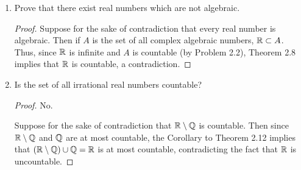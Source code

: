 \documentclass[../psets.tex]{subfiles}
\begin{document}
\begin{enumerate}[label={\textbf{\arabic*.}}]
\begin{proof}
        Define a family of sets $\{A_N\}$ such that each $A_N$ is the set of all complex zeroes of all polynomials $\sum_{k=0}^na_kz^{n-k}$ with integer coefficients $a_0,\dots,a_n$, not all zero, satisfying the equation $n+|a_0|+\cdots+|a_n|=N$. Symbolically, let each
        \begin{equation*}
            A_N = \{z\in\C\mid\textstyle\sum_{k=0}^na_kz^{n-k}=0,\ a_0,\dots,a_n\in\Z,\ \exists\ a_i:a_i\neq 0,\ n+|a_0|+\cdots+|a_n|=N\}
        \end{equation*}
        Since there are only finitely many equations with $n+|a_0|+\cdots+|a_n|=N$ for each $N$ by the hint, there are only finitely many corresponding polynomials $\sum_{k=0}^na_kz^{n-k}$ for each $N$. By the fundamental theorem of arithmetic, every polynomial $p$ has at most $\deg p$ distinct solutions. Thus, since each $A_N$ is the union of finitely many finite sets, each $A_N$ is finite.\par
        Consider the set $A=\bigcup_{N=1}^\infty A_N$. Since every algebraic number is a zero of a polynomial with integer coefficients, not all zero, whose coefficients' absolute values and degree add up to \emph{some} positive integer $N$, $A$ is the set of all algebraic numbers. Moreover, as the union of an at most countable number of at most countable sets, the Corollary to Theorem 2.12 implies that $A$ is at most countable. Additionally, since the set of solutions to $a_0z+a_1=0$ for $a_0,a_1\in\Z$, $a_0\neq 0$ is both a subset of the algebraic numbers and equal to $\Q$ (a countable set), $A$ is at least countable. Therefore, $A$ is countable, as desired.
    \end{proof}
    \item Prove that there exist real numbers which are not algebraic.
    \begin{proof}
        Suppose for the sake of contradiction that every real number is algebraic. Then if $A$ is the set of all complex algebraic numbers, $\mathbb{R}\subset A$. Thus, since $\mathbb{R}$ is infinite and $A$ is countable (by Problem 2.2), Theorem 2.8 implies that $\mathbb{R}$ is countable, a contradiction.
    \end{proof}
    \item Is the set of all irrational real numbers countable?
    \begin{proof}
        No.\par
        Suppose for the sake of contradiction that $\mathbb{R}\setminus\mathbb{Q}$ is countable. Then since $\mathbb{R}\setminus\mathbb{Q}$ and $\Q$ are at most countable, the Corollary to Theorem 2.12 implies that $(\mathbb{R}\setminus\mathbb{Q})\cup\mathbb{Q}=\mathbb{R}$ is at most countable, contradicting the fact that $\mathbb{R}$ is uncountable.

\end{proof}
\end{enumerate}
\end{document}
